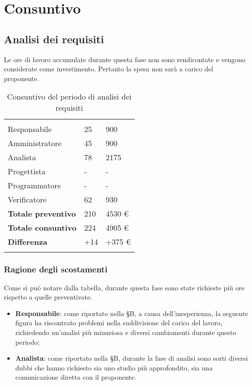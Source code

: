 \section{Consuntivo}


\subsection{Analisi dei requisiti}

Le ore di lavoro accumulate durante questa fase non sono rendicontate e vengono considerate come investimento. Pertanto la spesa non sarà a carico del proponente.

{
\setlength\arrayrulewidth{1pt}
\begin{longtable}{ C{4cm} C{3cm} C{3.5cm}} 
 	 &
 	 &
 	 \\
 	
 	Responsabile & 25  & 900 \\
 	Amministratore & 45 & 900\\
 	Analista & 78  & 2175 \\
 	Progettista & - & -\\
 	Programmatore & - & -\\
 	Verificatore & 62 & 930\\
 	
	\hline 	
 	
 	\textbf{Totale preventivo} &
	210 &
 	4530 € \\		
 	
 	\textbf{Totale consuntivo} &
	224 &
 	4905 € \\	
 	
 	\textbf{Differenza} &
	+14 &
 	+375 € \\	
 	
 	\caption{Consuntivo del periodo di analisi dei requisiti}
\end{longtable}
}

\subsubsection{Ragione degli scostamenti}
Come si può notare dalla tabella, durante questa fase sono state richieste più ore rispetto a quelle preventivate.
\begin{itemize}
\item \textbf{Responsabile}: come riportato nella \S B, a causa dell'inesperienza, la seguente figura ha riscontrato problemi nella suddivisione del carico del lavoro, richiedendo un'analisi più minuziosa e diversi cambiamenti durante questo periodo;
\item \textbf{Analista}: come riportato nella \S B, durante la fase di analisi sono sorti diversi dubbi che hanno richiesto sia uno studio più approfondito, sia una comunicazione diretta con il proponente.
\end{itemize}

